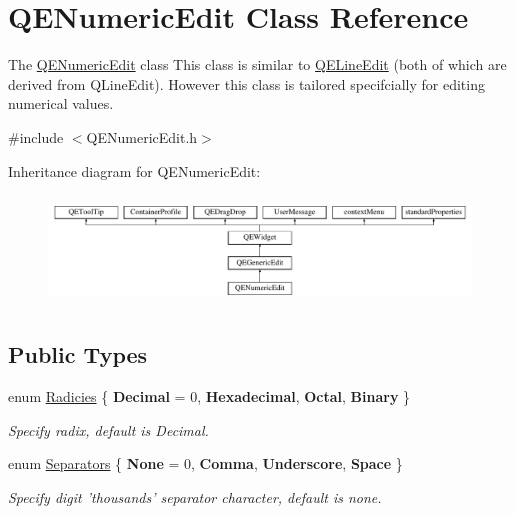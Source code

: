 \hypertarget{classQENumericEdit}{
\section{QENumericEdit Class Reference}
\label{classQENumericEdit}
}


The \hyperlink{classQENumericEdit}{QENumericEdit} class This class is similar to \hyperlink{classQELineEdit}{QELineEdit} (both of which are derived from QLineEdit). However this class is tailored specifcially for editing numerical values.  




{\ttfamily \#include $<$QENumericEdit.h$>$}

Inheritance diagram for QENumericEdit:\begin{figure}[H]
\begin{center}
\leavevmode
\includegraphics[height=2.939633cm]{classQENumericEdit}
\end{center}
\end{figure}
\subsection*{Public Types}
\begin{DoxyCompactItemize}
\item 
enum \hyperlink{classQENumericEdit_a147ff9d9e547fe10391849a89f359223}{Radicies} \{ {\bfseries Decimal} =  0, 
{\bfseries Hexadecimal}, 
{\bfseries Octal}, 
{\bfseries Binary}
 \}
\begin{DoxyCompactList}\small\item\em Specify radix, default is Decimal. \end{DoxyCompactList}\item 
enum \hyperlink{classQENumericEdit_a42cabb099c034289576897ac0d8e89e0}{Separators} \{ {\bfseries None} =  0, 
{\bfseries Comma}, 
{\bfseries Underscore}, 
{\bfseries Space}
 \}
\begin{DoxyCompactList}\small\item\em Specify digit 'thousands' separator character, default is none. \end{DoxyCompactList}\end{DoxyCompactItemize}
